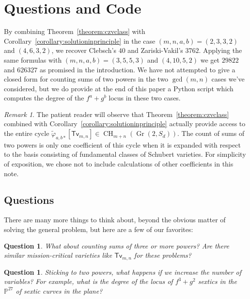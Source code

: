 \documentclass[12pt]{article}
\theoremstyle{plain}
\newtheorem{question}[theorem]{Question}
\theoremstyle{remark}
\newtheorem{remark}[theorem]{Remark}
\renewcommand{\P}{\mathbb{P}}
\newcommand{\Gr}{\operatorname{Gr}}
\newcommand{\CH}{\operatorname{CH}}
\newcommand{\transvectant}{\mathsf{Tv}}
\begin{document}
\section{Questions and Code}

By combining Theorem~\ref{theorem:czvclass} with Corollary~\ref{corollary:solutioninprinciple} in the case $(m,n,a,b) = (2,3,3,2)$ and $(4,6,3,2)$, we recover Clebsch's $40$ and Zariski-Vakil's $3762$.  Applying the same formulas with $(m,n,a,b) = (3,5,5,3)$ and $(4,10,5,2)$ we get $29822$ and $626327$ as promised in the introduction.  We have not attempted to give a closed form for counting sums of two powers in the two $\gcd(m,n)$ cases we've considered, but we do provide at the end of this paper a Python script which computes the degree of the $f^{a} + g^{b}$ locus in these two cases.

\begin{remark}
    \label{remark:entirecycle}
    The patient reader will observe that Theorem~\ref{theorem:czvclass} combined with Corollary~\ref{corollary:solutioninprinciple} actually provide access to the entire cycle $\widetilde{\varphi}_{a,b *}[\transvectant_{m,n}] \in \CH_{m+n}(\Gr(2,S_{d}))$.  The count of sums of two powers is only one coefficient of this cycle when it is expanded with respect to the basis consisting of fundamental classes of Schubert varieties.  For simplicity of exposition, we chose not to include calculations of other coefficients in this note.
\end{remark}

\subsection{Questions}

There are many more things to think about, beyond the obvious matter of solving the general problem, but here are a few of our favorites:

\begin{question}
    \label{question:general} What about counting sums of three or more powers? Are there similar mission-critical varieties like $\transvectant_{m,n}$ for these problems?
\end{question}

\begin{question}
    \label{question:higherforms} Sticking to two powers, what happens if we increase the number of variables?  For example, what is the degree of the locus of $f^{3} + g^{2}$ sextics in the $\P^{27}$ of sextic curves in the plane?
\end{question}
\end{document}
